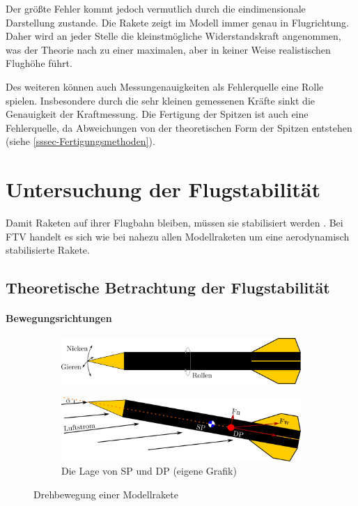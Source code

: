 \documentclass[10pt,a4paper]{article}
\begin{document}
Der größte Fehler kommt jedoch vermutlich durch die eindimensionale Darstellung zustande. Die Rakete zeigt im Modell immer genau in Flugrichtung. Daher wird an jeder Stelle die kleinstmögliche Widerstandskraft angenommen, was der Theorie nach zu einer maximalen, aber in keiner Weise realistischen Flughöhe führt. 

Des weiteren können auch Messungenauigkeiten als Fehlerquelle eine Rolle spielen. Insbesondere durch die sehr kleinen gemessenen Kräfte sinkt die Genauigkeit der Kraftmessung. Die Fertigung der Spitzen ist auch eine Fehlerquelle, da Abweichungen von der theoretischen Form der Spitzen entstehen (siehe \ref{sssec-Fertigungsmethoden}).



\section{Untersuchung der Flugstabilität}

Damit Raketen auf ihrer Flugbahn bleiben, müssen sie stabilisiert werden \cite{dl}. Bei FTV handelt es sich wie bei nahezu allen Modellraketen um eine aerodynamisch stabilisierte Rakete.


\subsection{Theoretische Betrachtung der Flugstabilität}
\label{ssec-Theoretische-Btrachtung-Flugstabilität}

\paragraph{Bewegungsrichtungen}

\begin{figure}[h]
\begin{subfigure}[l]{0.49\textwidth}
	\centering
	\includegraphics[width=\textwidth]{Bilder/Freiheitsgrade.png}
	\label{sfig-Freihetsgrade}
\end{subfigure}
\begin{subfigure}[l]{0.49\textwidth}
	\centering
	\includegraphics[width=\textwidth]{Bilder/Lage-DP-SP.png}
	\caption{Die Lage von SP und DP (eigene Grafik)}
	\label{sfig-Lage-DP-SP}
\end{subfigure}
\caption{Drehbewegung einer Modellrakete}
\end{figure}
\end{document}
